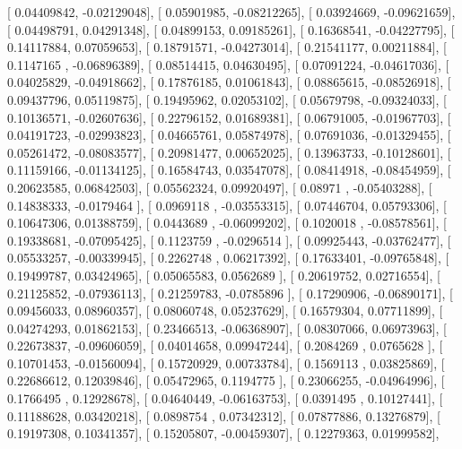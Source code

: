 \documentclass{article}
\begin{document}
       [ 0.04409842, -0.02129048],
       [ 0.05901985, -0.08212265],
       [ 0.03924669, -0.09621659],
       [ 0.04498791,  0.04291348],
       [ 0.04899153,  0.09185261],
       [ 0.16368541, -0.04227795],
       [ 0.14117884,  0.07059653],
       [ 0.18791571, -0.04273014],
       [ 0.21541177,  0.00211884],
       [ 0.1147165 , -0.06896389],
       [ 0.08514415,  0.04630495],
       [ 0.07091224, -0.04617036],
       [ 0.04025829, -0.04918662],
       [ 0.17876185,  0.01061843],
       [ 0.08865615, -0.08526918],
       [ 0.09437796,  0.05119875],
       [ 0.19495962,  0.02053102],
       [ 0.05679798, -0.09324033],
       [ 0.10136571, -0.02607636],
       [ 0.22796152,  0.01689381],
       [ 0.06791005, -0.01967703],
       [ 0.04191723, -0.02993823],
       [ 0.04665761,  0.05874978],
       [ 0.07691036, -0.01329455],
       [ 0.05261472, -0.08083577],
       [ 0.20981477,  0.00652025],
       [ 0.13963733, -0.10128601],
       [ 0.11159166, -0.01134125],
       [ 0.16584743,  0.03547078],
       [ 0.08414918, -0.08454959],
       [ 0.20623585,  0.06842503],
       [ 0.05562324,  0.09920497],
       [ 0.08971   , -0.05403288],
       [ 0.14838333, -0.0179464 ],
       [ 0.0969118 , -0.03553315],
       [ 0.07446704,  0.05793306],
       [ 0.10647306,  0.01388759],
       [ 0.0443689 , -0.06099202],
       [ 0.1020018 , -0.08578561],
       [ 0.19338681, -0.07095425],
       [ 0.1123759 , -0.0296514 ],
       [ 0.09925443, -0.03762477],
       [ 0.05533257, -0.00339945],
       [ 0.2262748 ,  0.06217392],
       [ 0.17633401, -0.09765848],
       [ 0.19499787,  0.03424965],
       [ 0.05065583,  0.0562689 ],
       [ 0.20619752,  0.02716554],
       [ 0.21125852, -0.07936113],
       [ 0.21259783, -0.0785896 ],
       [ 0.17290906, -0.06890171],
       [ 0.09456033,  0.08960357],
       [ 0.08060748,  0.05237629],
       [ 0.16579304,  0.07711899],
       [ 0.04274293,  0.01862153],
       [ 0.23466513, -0.06368907],
       [ 0.08307066,  0.06973963],
       [ 0.22673837, -0.09606059],
       [ 0.04014658,  0.09947244],
       [ 0.2084269 ,  0.0765628 ],
       [ 0.10701453, -0.01560094],
       [ 0.15720929,  0.00733784],
       [ 0.1569113 ,  0.03825869],
       [ 0.22686612,  0.12039846],
       [ 0.05472965,  0.1194775 ],
       [ 0.23066255, -0.04964996],
       [ 0.1766495 ,  0.12928678],
       [ 0.04640449, -0.06163753],
       [ 0.0391495 ,  0.10127441],
       [ 0.11188628,  0.03420218],
       [ 0.0898754 ,  0.07342312],
       [ 0.07877886,  0.13276879],
       [ 0.19197308,  0.10341357],
       [ 0.15205807, -0.00459307],
       [ 0.12279363,  0.01999582],
\end{document}
